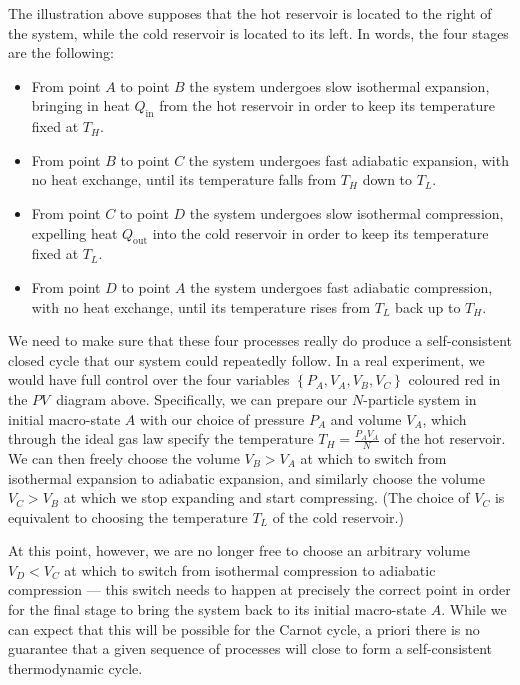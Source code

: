 The illustration above supposes that the hot reservoir is located to the right of the system, while the cold reservoir is located to its left.
In words, the four stages are the following: \\[-24 pt]
\begin{itemize}
  \item From point $A$ to point $B$ the system undergoes slow isothermal expansion, bringing in heat $Q_{\text{in}}$ from the hot reservoir in order to keep its temperature fixed at $T_H$.
  \item From point $B$ to point $C$ the system undergoes fast adiabatic expansion, with no heat exchange, until its temperature falls from $T_H$ down to $T_L$.
  \item From point $C$ to point $D$ the system undergoes slow isothermal compression, expelling heat $Q_{\text{out}}$ into the cold reservoir in order to keep its temperature fixed at $T_L$.
  \item From point $D$ to point $A$ the system undergoes fast adiabatic compression, with no heat exchange, until its temperature rises from $T_L$ back up to $T_H$.
\end{itemize}

We need to make sure that these four processes really do produce a self-consistent closed cycle that our system could repeatedly follow.
In a real experiment, we would have full control over the four variables $\left\{P_A, V_A, V_B, V_C\right\}$ coloured red in the $PV$~diagram above.
Specifically, we can prepare our $N$-particle system in initial macro-state $A$ with our choice of pressure $P_A$ and volume $V_A$, which through the ideal gas law specify the temperature $T_H = \frac{P_A V_A}{N}$ of the hot reservoir.
We can then freely choose the volume $V_B > V_A$ at which to switch from isothermal expansion to adiabatic expansion, and similarly choose the volume $V_C > V_B$ at which we stop expanding and start compressing.
(The choice of $V_C$ is equivalent to choosing the temperature $T_L$ of the cold reservoir.) %

At this point, however, we are no longer free to choose an arbitrary volume $V_D < V_C$ at which to switch from isothermal compression to adiabatic compression --- this switch needs to happen at precisely the correct point in order for the final stage to bring the system back to its initial macro-state $A$.
While we can expect that this will be possible for the Carnot cycle, a priori there is no guarantee that a given sequence of processes will close to form a self-consistent thermodynamic cycle.

